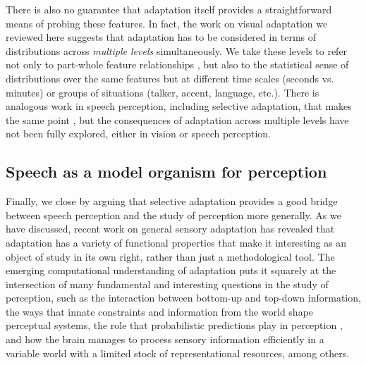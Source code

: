 There is also no guarantee that adaptation itself provides a straightforward means of probing these features.  In fact, the work on visual adaptation we reviewed here suggests that adaptation has to be considered in terms of distributions across \emph{multiple levels} simultaneously.  We take these levels to refer not only to part-whole feature relationships \cite{He2012}, but also to the statistical sense of distributions over the same features but at different time scales (seconds vs. minutes) \cite{Chopin2012} or groups of situations (talker, accent, language, etc.). There is analogous work in speech perception, including selective adaptation, that makes the same point \cites[e.g., adaptation of single segments depends on the syllabic context][]{Bryant1978}[and others summarized in][]{Remez1987}, but the consequences of adaptation across multiple levels have not been fully explored, either in vision or speech perception.


\subsection{Speech as a model organism for perception}
\label{sec:speech-as-model}

Finally, we close by arguing that selective adaptation provides a good bridge between speech perception and the study of perception more generally.  As we have discussed, recent work on general sensory adaptation has revealed that adaptation has a variety of functional properties that make it interesting as an object of study in its own right, rather than just a methodological tool.  The emerging computational understanding of adaptation puts it squarely at the intersection of many fundamental and interesting questions in the study of perception, such as the interaction between bottom-up and top-down information, the ways that innate constraints and information from the world shape perceptual systems, the role that probabilistic predictions play in perception \cite[e.g.,][]{He2012}, and how the brain manages to process sensory information efficiently in a variable world with a limited stock of representational resources, among others.  

